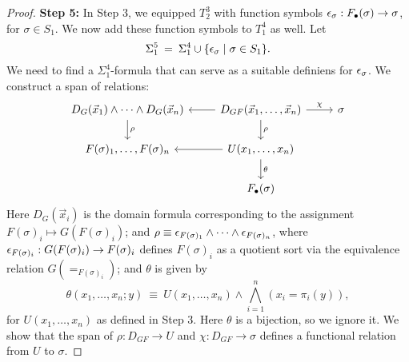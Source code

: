 \begin{proof}
\bigskip \textbf{Step 5:} In Step 3, we equipped $T_2^3$ with function
symbols $\epsilon _\sigma :F_\bullet (\sigma )\to \sigma$, for
$\sigma\in S_1$.  We now add these function symbols to $T_1^4$ as
well.  Let
\[ \Sigma _1^5 \: = \: \Sigma _1^4\cup \{ \epsilon _\sigma \mid \sigma\in
  S_1 \} .\] We need to find a $\Sigma _1^4$-formula that can serve as
a suitable definiens for $\epsilon _\sigma$.  We construct a span of
relations:
\[ \begin{tikzcd}
     D_G(\vec{x}_1)\wedge\cdots\wedge D_G(\vec{x}_n) \arrow{d}{\rho} &
     D_{GF}(\vec{x}_1,\dots ,\vec{x}_n) \arrow{l} \arrow{d}{\rho}
     \arrow{r}{\chi} & \sigma \\
    F(\sigma )_1,\dots ,F(\sigma )_n  & U(x_1,\dots ,x_n) \arrow{l}
    \arrow{d}{\theta} \\
    & F_\bullet (\sigma ) &  
  \end{tikzcd} \] Here $D_G(\vec{x}_i)$ is the domain formula
corresponding to the assignment $F(\sigma )_i\mapsto G(F(\sigma )_i)$;
and
$\rho\equiv\epsilon _{F(\sigma )_1}\wedge\cdots\wedge\epsilon _{F(\sigma
  )_n}$, where $\epsilon _{F(\sigma )_i}:G(F(\sigma )_i)\to F(\sigma )_i$
defines $F(\sigma )_i$ as a quotient sort via the equivalence relation
$G(=_{F(\sigma )_i})$; and $\theta$ is given by
\[ \theta (x_1,\dots ,x_n;y) \: \equiv \: U(x_1,\dots ,x_n)\wedge
  \bigwedge _{i=1}^n(x_i=\pi _i(y)) ,\] for $U(x_1,\dots ,x_n)$ as
defined in Step 3.  Here $\theta$ is a bijection, so we ignore it.  We
show that the span of $\rho :D_{GF}\to U$ and $\chi :D_{GF}\to \sigma$
defines a functional relation from $U$ to $\sigma$.


\end{proof}
